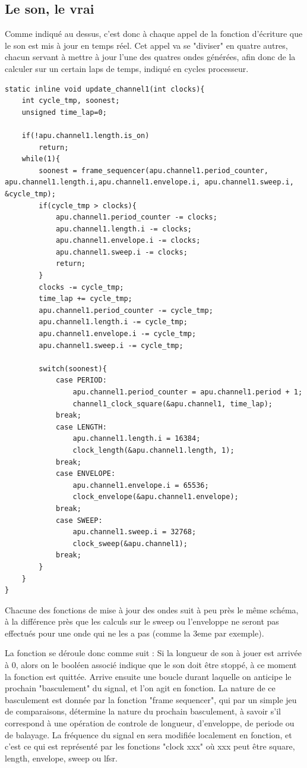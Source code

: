 \documentclass{report}
\begin{document}
\subsection{Le son, le vrai}
Comme indiqué au dessus, c'est donc à chaque appel de la fonction d'écriture que le son est mis à jour en temps réel.
Cet appel va se "diviser" en quatre autres, chacun servant à mettre à jour l'une des quatres ondes générées, afin donc de la calculer sur un certain laps de temps, indiqué en cycles processeur.

\begin{lstlisting}
static inline void update_channel1(int clocks){
	int cycle_tmp, soonest;
	unsigned time_lap=0;

	if(!apu.channel1.length.is_on)
		return;
	while(1){
		soonest = frame_sequencer(apu.channel1.period_counter, apu.channel1.length.i,apu.channel1.envelope.i, apu.channel1.sweep.i, &cycle_tmp);
		if(cycle_tmp > clocks){
			apu.channel1.period_counter -= clocks;
			apu.channel1.length.i -= clocks;
			apu.channel1.envelope.i -= clocks;
			apu.channel1.sweep.i -= clocks;
			return;
		}
		clocks -= cycle_tmp;
		time_lap += cycle_tmp;
		apu.channel1.period_counter -= cycle_tmp;
		apu.channel1.length.i -= cycle_tmp;
		apu.channel1.envelope.i -= cycle_tmp;
		apu.channel1.sweep.i -= cycle_tmp;
		
		switch(soonest){
			case PERIOD:
				apu.channel1.period_counter = apu.channel1.period + 1;
				channel1_clock_square(&apu.channel1, time_lap);
			break;
			case LENGTH:
				apu.channel1.length.i = 16384;
				clock_length(&apu.channel1.length, 1);
			break;
			case ENVELOPE:
				apu.channel1.envelope.i = 65536;
				clock_envelope(&apu.channel1.envelope);
			break;
			case SWEEP:
				apu.channel1.sweep.i = 32768;
				clock_sweep(&apu.channel1);
			break;
		}
	}
}
\end{lstlisting}

Chacune des fonctions de mise à jour des ondes suit à peu près le même schéma, à la différence près que les calculs sur le sweep ou l'enveloppe ne seront 
pas effectués pour une onde qui ne les a pas (comme la 3eme par exemple).

La fonction se déroule donc comme suit :
Si la longueur de son à jouer est arrivée à 0, alors on le booléen associé indique que le son doit être stoppé, à ce moment la fonction est quittée.
Arrive ensuite une boucle durant laquelle on anticipe le prochain "basculement" du signal, et l'on agit en fonction.
La nature de ce basculement est donnée par la fonction "frame sequencer", qui par un simple jeu de comparaisons, détermine la nature du prochain basculement, 
à savoir s'il correspond à une opération de controle de longueur, d'enveloppe, de periode ou de balayage.
La fréquence du signal en sera modifiée localement en fonction, et c'est ce qui est représenté par les fonctions "clock xxx" où xxx peut être square, length, envelope, sweep ou lfsr.
\end{document}
